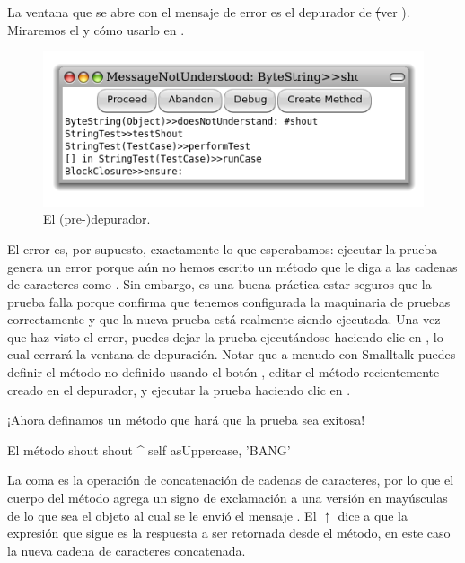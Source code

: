 \documentclass[a4paper,10pt,twoside]{book}
\begin{document}
La ventana que se abre con el mensaje de error es el depurador de \st (ver ).
Miraremos el  y c\'omo usarlo en .

\begin{figure}[hbt]
\centerline {\includegraphics[width=\textwidth]{Predebugger}}
\caption{El (pre-)depurador.}
\end{figure}

El error es, por supuesto, exactamente lo que esperabamos: ejecutar la prueba genera un error porque a\'un no hemos escrito un m\'etodo que le diga a las cadenas de caracteres como .
Sin embargo, es una buena pr\'actica estar seguros que la prueba falla porque confirma que tenemos configurada la maquinaria de pruebas correctamente y que la nueva prueba est\'a realmente siendo ejecutada.
Una vez que haz visto el error, puedes dejar la prueba ejecut\'andose haciendo clic en , lo cual cerrar\'a la ventana de depuraci\'on.
Notar que a menudo con Smalltalk puedes definir el m\'etodo no definido usando el bot\'on , editar el m\'etodo recientemente creado en el depurador, y ejecutar la prueba haciendo clic en .

¡Ahora definamos un m\'etodo que har\'a que la prueba sea exitosa!

\begin{method}[shout]{El m\'etodo shout}
shout
	^ self asUppercase, 'BANG'
\end{method}

La coma es la operaci\'on de concatenaci\'on de cadenas de caracteres, por lo que el cuerpo del m\'etodo agrega un signo de exclamaci\'on a una versi\'on en may\'usculas de lo que sea el objeto  al cual se le envi\'o el mensaje .
El $\uparrow$ dice a \pharo que la expresi\'on que sigue es la respuesta a ser retornada desde el m\'etodo, en este caso la nueva cadena de caracteres concatenada.
\end{document}
